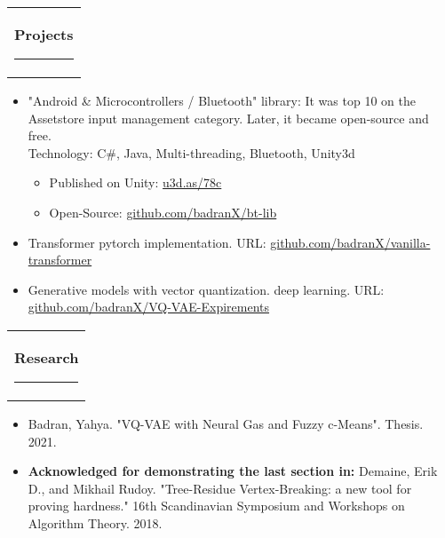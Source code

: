 \documentclass[10pt,A4,english]{article}
\newcommand{\mpwidth}{\linewidth-\fboxsep-\fboxsep}
\newcommand{\cvtext}[1] {
	\begin{tabular*}{1\mpwidth}{p{0.98\mpwidth}}
		\parbox{1\mpwidth}{#1}
	\end{tabular*}
}
\newcommand{\cvsectionTight}[1] {
	\cvtext{
		\textbf{\Large{\textcolor{darkcol}{#1}}}\\[-4pt]
		\textcolor{accentcol}{ \rule{0.2\textwidth}{1.5pt} }%
	}
	\vspace{4pt}
}
\newcommand{\techno}[1]{
\textcolor{maincol}{\footnotesize Technology: #1}
}
\begin{document}
\begin{paracol}{2}
\begin{sloppypar}
\cvsectionTight{Projects}
\begin{itemize}
\item  "Android \& Microcontrollers / Bluetooth" library: It was top 10 on the Assetstore input management category. Later, it became open-source and free.\\\techno{C\#, Java, Multi-threading, Bluetooth, Unity3d}
\begin{itemize}
\item Published on Unity: \href{https://assetstore.unity.com/packages/slug/16467}{u3d.as/78c}
\item Open-Source: \href{https://github.com/badranX/bt-lib}{github.com/badranX/bt-lib}
\end{itemize}
\vspace{2pt}
\item Transformer pytorch implementation. \footnotesize URL: \href{https://github.com/badranX/vanilla-transformer}{github.com/badranX/vanilla-transformer}
\vspace{2pt}
\item Generative models with vector quantization. deep learning. \footnotesize URL: \href{https://github.com/badranX/VQ-VAE-Expirements}{github.com/badranX/VQ-VAE-Expirements}
\end{itemize}
\vspace{6pt}
\cvsectionTight{Research}
\begin{itemize}[leftmargin=*]
\item Badran, Yahya. "VQ-VAE with Neural Gas and Fuzzy c-Means". Thesis. 2021.
\item \textbf{Acknowledged for demonstrating the last section in:} Demaine, Erik D., and Mikhail Rudoy. "Tree-Residue Vertex-Breaking: a new tool for proving hardness." 16th Scandinavian Symposium and Workshops on Algorithm Theory. 2018.

\end{itemize}
\end{sloppypar}
\end{paracol}
\end{document}
